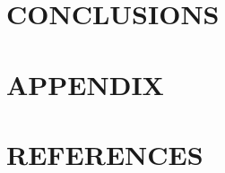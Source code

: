 \documentclass[twocolumn,prl,nobalancelastpage,aps,10pt]{revtex4-1}
\begin{document}

\section{CONCLUSIONS}


\section{APPENDIX}

%

\section{REFERENCES}



\end{document}
